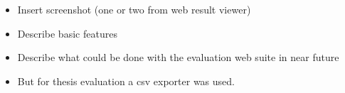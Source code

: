 \begin{itemize}
  \item Insert screenshot (one or two from web result viewer)
  \item Describe basic features
  \item Describe what could be done with the evaluation web suite in near future
  \item But for thesis evaluation a csv exporter was used.
\end{itemize}





